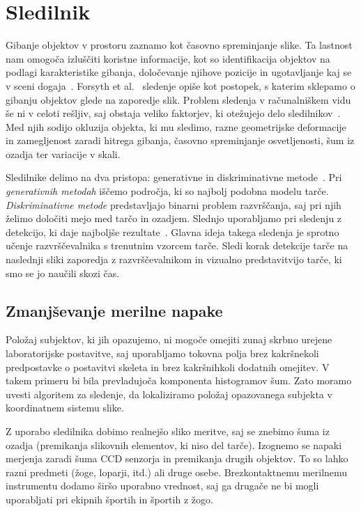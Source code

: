 \section{Sledilnik}
%
Gibanje objektov v prostoru zaznamo kot časovno spreminjanje slike. Ta lastnost nam omogoča izluščiti koristne informacije, kot so identifikacija objektov na podlagi karakteristike gibanja, določevanje njihove pozicije in ugotavljanje kaj se v sceni dogaja~\cite{forsyth2002computer}. Forsyth et al.~\cite{forsyth2002computer} sledenje opiše kot postopek, s katerim sklepamo o gibanju objektov glede na zaporedje slik. Problem sledenja v računalniškem vidu še ni v celoti rešljiv, saj obstaja veliko faktorjev, ki otežujejo delo sledilnikov~\cite{danelljan2014adaptive}. Med njih sodijo okluzija objekta, ki mu sledimo, razne geometrijske deformacije in zamegljenost zaradi hitrega gibanja, časovno spreminjanje osvetljenosti, šum iz ozadja ter variacije v skali. 

Sledilnike delimo na dva pristopa: generativne in diskriminativne metode~\cite{danelljan2014adaptive}. Pri \emph{generativnih metodah} iščemo področja, ki so najbolj podobna modelu tarče. \emph{Diskriminativne metode} predstavljajo binarni problem razvrščanja, saj pri njih želimo določiti mejo med tarčo in ozadjem. Slednjo uporabljamo pri sledenju z detekcijo, ki daje najboljše rezultate~\cite{danelljan2014adaptive}. Glavna ideja takega sledenja je sprotno učenje razvrščevalnika s trenutnim vzorcem tarče. Sledi korak detekcije tarče na naslednji sliki zaporedja z razvrščevalnikom in vizualno predstavitvijo tarče, ki smo se jo naučili skozi čas.






\subsection{Zmanjševanje merilne napake}

Položaj subjektov, ki jih opazujemo, ni mogoče omejiti zunaj skrbno urejene laboratorijske postavitve, saj uporabljamo tokovna polja brez kakršnekoli predpostavke o postavitvi skeleta in brez kakršnihkoli dodatnih omejitev. V takem primeru bi bila prevladujoča komponenta histogramov šum. Zato moramo uvesti algoritem za sledenje, da lokaliziramo položaj opazovanega subjekta v koordinatnem sistemu slike.

Z uporabo sledilnika dobimo realnejšo sliko meritve, saj se znebimo šuma iz ozadja (premikanja slikovnih elementov, ki niso del tarče). Izognemo se napaki merjenja zaradi šuma CCD senzorja in premikanja drugih objektov. To so lahko razni predmeti (žoge, loparji, itd.) ali druge osebe. Brezkontaktnemu merilnemu instrumentu dodamo širšo uporabno vrednost, saj ga drugače ne bi mogli uporabljati pri ekipnih športih in športih z žogo. 

